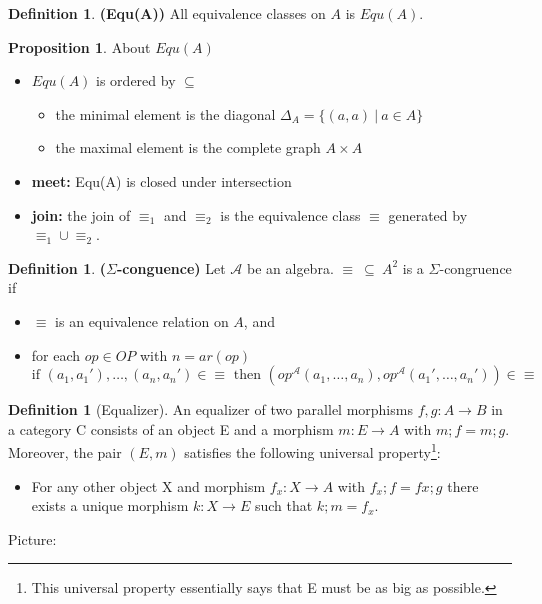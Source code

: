 \documentclass{amsart}
\theoremstyle{definition}
\newtheorem{definition}[thm]{Definition}
\newtheorem{proposition}[thm]{Proposition}
\newcommand{\ca}{\mathcal A} %
\begin{document}
\begin{definition}\textbf{(Equ(A))} All equivalence classes on $A$ is $Equ(A)$.
\end{definition}

\begin{proposition} About $Equ(A)$
  \begin{itemize}
  \item $Equ(A)$ is ordered by $\subseteq$
    \begin{itemize}
    \item the minimal element is the diagonal $\Delta_A = \{(a,a) ~|~ a \in A\}$
    \item the maximal element is the complete graph $A\times A$
    \end{itemize}
  \item \textbf{meet:} Equ(A) is closed under intersection
  \item \textbf{join:} the join of $\equiv_1$ and $\equiv_2$ is the equivalence class $\equiv$
    generated by $\equiv_1 \cup \equiv_2$.
  \end{itemize}
\end{proposition}

\begin{definition}\textbf{($\Sigma$-conguence)} Let $\ca$ be an algebra. $\equiv ~\subseteq~ A^2$
  is a $\Sigma$-congruence if
  \begin{itemize}
  \item $\equiv$ is an equivalence relation on $A$, and
  \item for each $op \in OP$ with $n = ar(op)$
$$ \text{if } (a_1, a_1'), \dots , (a_n, a_n') \in \equiv \text{ then } (op^\ca(a_1, \dots, a_n), op^\ca(a_1', \dots, a_n')) \in \equiv$$
\end{itemize}
\end{definition}



\begin{definition}[Equalizer]
  \label{def:equalizer}
   An equalizer of two parallel morphisms $f, g : A \rightarrow B$
  in a category C consists of an object E and a morphism $m : E \rightarrow A$
  with $m; f = m; g$. Moreover, the pair $(E, m)$ satisfies the following universal
  property\footnote{This universal property essentially says that E must be as
    big as possible.}:
  \begin{itemize}
  \item For any other object X and morphism $f_x : X \rightarrow A$ with $f_{x} ; f = fx ;
    g$ there exists a unique morphism $k : X \rightarrow E$ such that $k; m =
    f_x$.
  \end{itemize}

  Picture:
  \end{definition}
\end{document}
